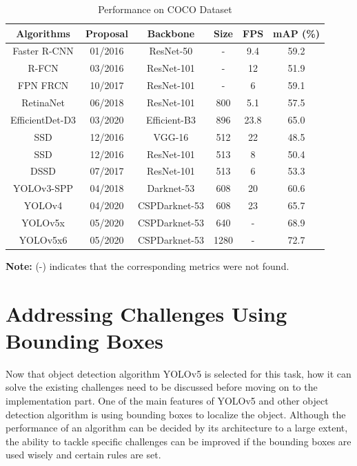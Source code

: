 \begin{table}
  \centering
  \caption{Performance on COCO Dataset}
  \label{tab:2}
  \begin{tabular}{cccccc}
    \toprule
    Algorithms & Proposal & Backbone & Size & FPS & mAP (\%) \\
    \midrule
    \midrule
    Faster R-CNN \cite{wang2019region} & 01/2016 & ResNet-50 & - & 9.4 & 59.2 \\
    R-FCN \cite{redmon} & 03/2016 & ResNet-101 & - & 12 & 51.9 \\
    FPN FRCN \cite{redmon} & 10/2017 & ResNet-101 & - & 6 & 59.1 \\
    \midrule
    RetinaNet \cite{lin2017focal} & 06/2018 & ResNet-101 & 800 & 5.1 & 57.5 \\
    \midrule
    EfficientDet-D3 \cite{tan2020efficientdet} & 03/2020 & Efficient-B3 & 896 & 23.8 & 65.0\\
    \midrule
    SSD \cite{liu2016ssd} & 12/2016 & VGG-16 & 512 & 22 & 48.5 \\
    SSD \cite{redmon} & 12/2016 & ResNet-101 & 513 & 8 & 50.4 \\
    DSSD \cite{redmon} & 07/2017 & ResNet-101 & 513 & 6 & 53.3 \\
    \midrule
    YOLOv3-SPP \cite{redmon2018yolov3} & 04/2018 & Darknet-53 & 608 & 20 & 60.6 \\
    YOLOv4 \cite{bochkovskiy2020yolov4} & 04/2020 & CSPDarknet-53 & 608 & 23 & 65.7 \\
    YOLOv5x \cite{ultralytics} & 05/2020 & CSPDarknet-53 & 640 & - & 68.9 \\
    YOLOv5x6 \cite{ultralytics} & 05/2020 & CSPDarknet-53 & 1280 & - & 72.7 \\
    \bottomrule
  \end{tabular}
  \vspace{0.8em}
  \begin{tablenotes}
    \item \textbf{Note:}  (-) indicates that the corresponding metrics were not found.
    
  \end{tablenotes}
\end{table}

\section{Addressing Challenges Using Bounding Boxes}

Now that object detection algorithm YOLOv5 is selected for this task, how it can solve the existing challenges need to be discussed before moving on to the implementation part. One of the main features of YOLOv5 and other object detection algorithm is using bounding boxes to localize the object. Although the performance of an algorithm can be decided by its architecture to a large extent, the ability to tackle specific challenges can be improved if the bounding boxes are used wisely and certain rules are set.

